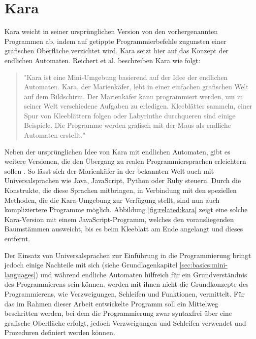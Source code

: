 \section{Kara}
\label{sec:related:kara}

Kara weicht in seiner ursprünglichen Version von den vorhergenannten Programmen ab, indem auf getippte Programmierbefehle zugunsten einer grafischen Oberfläche verzichtet wird. Kara setzt hier auf das Konzept der endlichen Automaten. Reichert et al. beschreiben Kara wie folgt:

\begin{quote}
    "Kara ist eine Mini-Umgebung basierend auf der Idee der endlichen Automaten. Kara, der Marienkäfer, lebt in einer einfachen grafischen Welt auf dem Bildschirm. Der Marienkäfer kann programmiert werden, um in seiner Welt verschiedene Aufgaben zu erledigen. Kleeblätter sammeln, einer Spur von Kleeblättern folgen oder Labyrinthe durchqueren sind einige Beispiele. Die Programme werden grafisch mit der Maus als endliche Automaten erstellt."~\cite[28]{reichert2004}
\end{quote}

Neben der ursprünglichen Idee von Kara mit endlichen Automaten, gibt es weitere Versionen, die den Übergang zu realen Programmiersprachen erleichtern sollen \cite{kara2017}. So lässt sich der Marienkäfer in der bekannten Welt auch mit Universalsprachen wie Java, JavaScript, Python oder Ruby steuern. Durch die Konstrukte, die diese Sprachen mitbringen, in Verbindung mit den speziellen Methoden, die die Kara-Umgebung zur Verfügung stellt, sind nun auch kompliziertere Programme möglich. Abbildung \ref{fig:related:kara} zeigt eine solche Kara-Version mit einem JavaScript-Programm, welches den vorausliegenden Baumstämmen ausweicht, bis es beim Kleeblatt am Ende angelangt und dieses entfernt.

Der Einsatz von Universalsprachen zur Einführung in die Programmierung bringt jedoch einige Nachteile mit sich (siehe Grundlagenkapitel \ref{sec:basics:mini-languages}) und während endliche Automaten hilfreich für ein Grundverständnis des Programmierens sein können, werden mit ihnen nicht die Grundkonzepte des Programmierens, wie Verzweigungen, Schleifen und Funktionen, vermittelt. Für das im Rahmen dieser Arbeit entwickelte Programm soll ein Mittelweg beschritten werden, bei dem die Programmierung zwar syntaxfrei über eine grafische Oberfläche erfolgt, jedoch Verzweigungen und Schleifen verwendet und Prozeduren definiert werden können.

